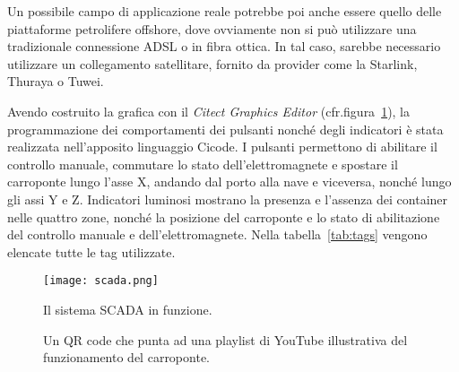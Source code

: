 Un possibile campo di applicazione reale potrebbe poi anche essere quello delle piattaforme
petrolifere offshore, dove ovviamente non si può utilizzare una tradizionale connessione ADSL o in
fibra ottica. In tal caso, sarebbe necessario utilizzare un collegamento satellitare, fornito da
provider come la Starlink, Thuraya o Tuwei.

Avendo costruito la grafica con il \emph{Citect Graphics Editor} (cfr.\@ figura~\ref{fig:scada}), la
programmazione dei comportamenti dei pulsanti nonché degli indicatori è stata realizzata
nell'apposito linguaggio Cicode. I pulsanti permettono di abilitare il controllo manuale, commutare
lo stato dell'elettromagnete e spostare il carroponte lungo l'asse X, andando dal porto alla nave e
viceversa, nonché lungo gli assi Y e Z. Indicatori luminosi mostrano la presenza e l'assenza dei
container nelle quattro zone, nonché la posizione del carroponte e lo stato di abilitazione del
controllo manuale e dell'elettromagnete. Nella tabella~\ref{tab:tags} vengono elencate tutte le tag
utilizzate.

\begin{figure}[htbp]\centering
    \caption{Il sistema SCADA in funzione.}\label{fig:scada}
    \texttt{[image: scada.png]}
\end{figure}

\begin{figure}[htbp]\centering
    \caption{Un QR code che punta ad una playlist di YouTube illustrativa del funzionamento del carroponte.}\label{fig:qrcode}
\end{figure}

